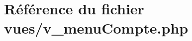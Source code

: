 \hypertarget{v__menu_compte_8php}{}\section{Référence du fichier vues/v\+\_\+menu\+Compte.php}
\label{v__menu_compte_8php}
